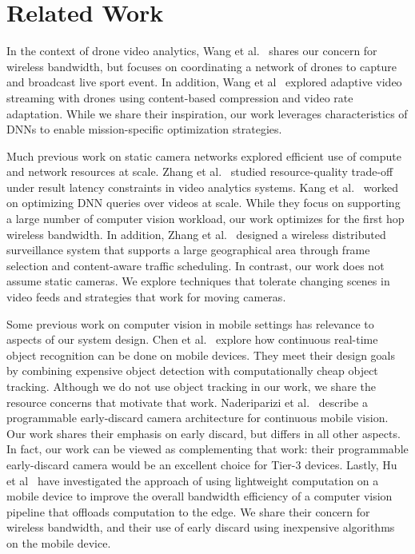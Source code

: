 \section{Related Work}
\label{bw:relatedwork}

In the context of drone video analytics, Wang et al.~\cite{Wang2017networked}
shares our concern for wireless bandwidth, but focuses on coordinating a network
of drones to capture and broadcast live sport event. In addition, Wang et
al~\cite{Wang2016skyeyes} explored adaptive video streaming with drones using
content-based compression and video rate adaptation. While we share their
inspiration, our work leverages characteristics of DNNs to enable
mission-specific optimization strategies.

Much previous work on static camera networks explored efficient use of compute
and network resources at scale. Zhang et al.~\cite{zhang2017live} studied
resource-quality trade-off under result latency constraints in video analytics
systems. Kang et al.~\cite{kang2017noscope} worked on optimizing DNN queries
over videos at scale. While they focus on supporting a large number of computer
vision workload, our work optimizes for the first hop wireless bandwidth. In
addition, Zhang et al.~\cite{zhang2015design} designed a wireless distributed
surveillance system that supports a large geographical area through frame
selection and content-aware traffic scheduling. In contrast, our work does not
assume static cameras. We explore techniques that tolerate changing scenes in
video feeds and strategies that work for moving cameras.

Some previous work on computer vision in mobile settings has relevance to
aspects of our system design.  Chen et al.~\cite{chen2015glimpse} explore how
continuous real-time object recognition can be done on mobile devices. They meet
their design goals by combining expensive object detection with computationally
cheap object tracking.  Although we do not use object tracking in our work, we
share the resource concerns that motivate that work.  Naderiparizi et
al.~\cite{naderiparizi2017glimpse} describe a programmable early-discard camera
architecture for continuous mobile vision.  Our work shares their emphasis on
early discard, but differs in all other aspects.  In fact, our work can be
viewed as complementing that work: their programmable early-discard camera would
be an excellent choice for Tier-3 devices. Lastly, Hu et al~\cite{Hu2015} have
investigated the approach of using lightweight computation on a mobile device to
improve the overall bandwidth efficiency of a computer vision pipeline that
offloads computation to the edge.  We share their concern for wireless
bandwidth, and their use of early discard using inexpensive algorithms on the
mobile device.

